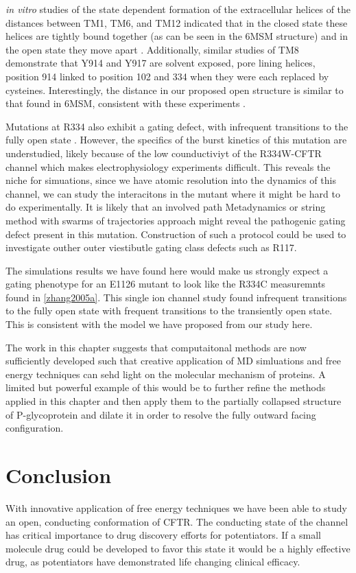 \textit {in vitro} studies of the state dependent formation of the extracellular helices of the distances between  TM1, TM6, and TM12 indicated that in the closed state these helices are tightly bound together (as can be seen in the 6MSM structure) and in the open state they move apart \cite{negoda2018}. Additionally, similar studies of TM8 demonstrate that Y914 and Y917 are solvent exposed, pore lining helices, position 914 linked to position 102 and 334 when they were each replaced by cysteines. Interestingly, the distance in our proposed open structure is similar to that found in 6MSM, consistent with these experiments \cite{negoda2019}. 

Mutations at R334 also exhibit a gating defect, with infrequent transitions to the fully open state \cite{zhang2005a ,cui2013a, sheppard1993}. However, the specifics of the burst kinetics of this mutation are understudied, likely because of the low counductiviyt of the R334W-CFTR channel which makes electrophysiology experiments difficult. This reveals the niche for simuations, since we have atomic resolution into the dynamics of this channel, we can study the interacitons in the mutant where it might be hard to do experimentally. It is likely that an involved path Metadynamics or string method with swarms of trajectories approach might reveal the pathogenic gating defect present in this mutation. Construction of such a protocol could be used to investigate outher outer viestibutle gating class defects such as R117.

The simulations results we have found here would make us strongly expect a gating phenotype for an E1126 mutant to look like the R334C measuremnts found in \ref{zhang2005a}. This single ion channel study found infrequent transitions to the fully open state with frequent transitions to the transiently open state. This is consistent with the model we have proposed from our study here.

The work in this chapter suggests that computaitonal methods are now sufficiently developed such that creative application of MD simluations and free energy techniques can sehd light on the molecular mechanism of proteins. A limited but powerful example of this would be to further refine the methods applied in this chapter and then apply them to the partially collapsed structure of P-glycoprotein and dilate it in order to resolve the fully outward facing configuration.

\section{Conclusion}
With innovative application of free energy techniques we have been able to study an open, conducting conformation of CFTR. The conducting state of the channel has critical importance to drug discovery efforts for potentiators. If a small molecule drug could be developed to favor this state it would be a highly effective drug, as potentiators have demonstrated life changing clinical efficacy.

